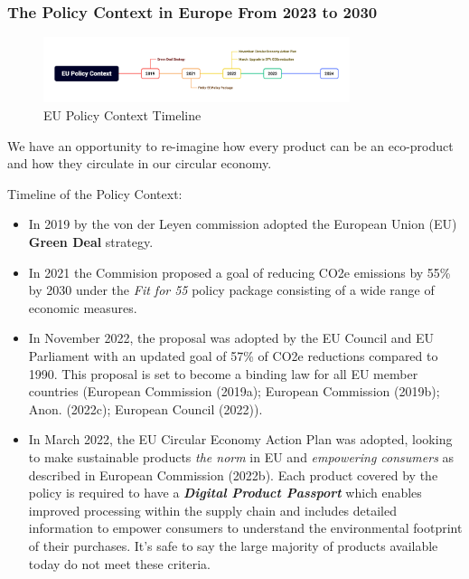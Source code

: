 \documentclass[
  letterpaper,
  DIV=11,
  numbers=noendperiod]{scrartcl}
\begin{document}
\subsubsection{The Policy Context in Europe From 2023 to
2030}\label{the-policy-context-in-europe-from-2023-to-2030}

\begin{figure}[H]

{\centering \includegraphics[width=0.8\textwidth,height=\textheight]{./images/eu-policy-context.png}

}

\caption{EU Policy Context Timeline}

\end{figure}%

We have an opportunity to re-imagine how every product can be an
eco-product and how they circulate in our circular economy.

Timeline of the Policy Context:

\begin{itemize}
\item
  In 2019 by the von der Leyen commission adopted the European Union
  (EU) \textbf{Green Deal} strategy.
\item
  In 2021 the Commision proposed a goal of reducing CO2e emissions by
  55\% by 2030 under the \emph{Fit for 55} policy package consisting of
  a wide range of economic measures.
\item
  In November 2022, the proposal was adopted by the EU Council and EU
  Parliament with an updated goal of 57\% of CO2e reductions compared to
  1990. This proposal is set to become a binding law for all EU member
  countries (European Commission (2019a); European Commission (2019b);
  Anon. (2022c); European Council (2022)).
\item
  In March 2022, the EU Circular Economy Action Plan was adopted,
  looking to make sustainable products \emph{the norm} in EU and
  \emph{empowering consumers} as described in European Commission
  (2022b). Each product covered by the policy is required to have a
  \textbf{\emph{Digital Product Passport}} which enables improved
  processing within the supply chain and includes detailed information
  to empower consumers to understand the environmental footprint of
  their purchases. It's safe to say the large majority of products
  available today do not meet these criteria.
\end{itemize}
\end{document}
